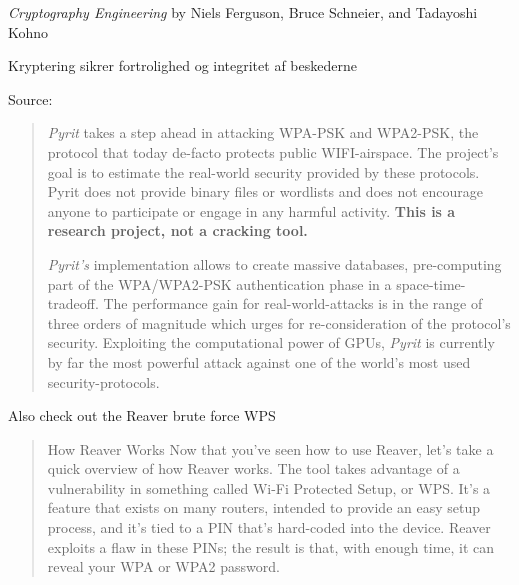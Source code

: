 \documentclass[20pt,landscape,a4paper,footrule]{foils}
\begin{document}


\emph{Cryptography Engineering} by
Niels Ferguson, Bruce Schneier, and Tadayoshi Kohno

\centerline{Kryptering sikrer fortrolighed og integritet af beskederne}




Source: 


\begin{quote}
\emph{Pyrit} takes a step ahead in attacking WPA-PSK and WPA2-PSK, the protocol that today de-facto protects public WIFI-airspace. The project's goal is to estimate the real-world security provided by these protocols. Pyrit does not provide binary files or wordlists and does not encourage anyone to participate or engage in any harmful activity. {\bf This is a research project, not a cracking tool.}

\emph{Pyrit's} implementation allows to create massive databases, pre-computing part of the WPA/WPA2-PSK authentication phase in a space-time-tradeoff. The performance gain for real-world-attacks is in the range of three orders of magnitude which urges for re-consideration of the protocol's security. Exploiting the computational power of GPUs, \emph{Pyrit} is currently by far the most powerful attack against one of the world's most used security-protocols. 
\end{quote}

\begin{list1}
\item {} 
\item Also check out the Reaver brute force WPS\\ 
\end{list1}


\begin{quote}
How Reaver Works
Now that you've seen how to use Reaver, let's take a quick overview of how Reaver works. The tool takes advantage of a vulnerability in something called Wi-Fi Protected Setup, or WPS. It's a feature that exists on many routers, intended to provide an easy setup process, and it's tied to a PIN that's hard-coded into the device. Reaver exploits a flaw in these PINs; the result is that, with enough time, it can reveal your WPA or WPA2 password.
\end{quote}
\end{document}
